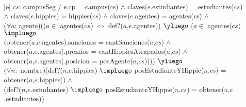 \begin{Representacion}
  ~
  
  [e]
  {$cs$: campusSeg $/$ e.cp = campus(cs) $\land$ claves($e$.estudiantes) = estudiantes($cs$) \\ $\land$ claves($e$.hippies) = hippies($cs$) $\land$ claves($e$.agentes) = agentes(cs) $\land$ \\
  ($\forall a$: agente)(($a \in$ agentes($cs$) $\iff$ def?($a$,$e$.agentes)) $\yluego$ ($a \in$ agentes($cs$) $\impluego$ \\
  (obtener($a$,$e$.agentes).sanciones = cantSanciones($a$,$cs$) $\land$\\
  obtener($a$,$e$.agentes).premios = cantHippiesAtrapados($a$,$cs$) $\land$\\
  obtener($a$,$e$.agentes).posicion = posAgente($a$,$cs$)))) $\yluego$ \\
  ($\forall n:$ nombre)(def?($n$,$e$.hippies) $\impluego$ posEstudianteYHippie($n$,$cs$) = obtener($a$,$e$.hippies)) $\land$\\
  (def?($n$,$e$.estudiantes) $\impluego$ posEstudianteYHippie($n$,$cs$) = obtener($a$,$e$.estudiantes)) }


\end{Representacion}


